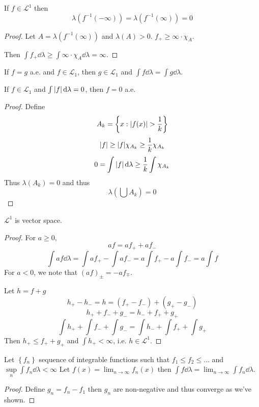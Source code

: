 \begin{prop}
	If $f\in \mathcal{L}^1$ then
	$$\lambda(f^{-1}(-\infty)) = \lambda(f^{-1}(\infty)) = 0$$
	\begin{proof}
		Let $A = \lambda(f^{-1}(\infty))$ and $\lambda(A) > 0$. 
		$f_+ \geq \infty \cdot \chi_A$.
		
		Then $\int f_+ \dd{\lambda} \geq \int \infty \cdot \chi_A \dd{\lambda} = \infty$.
	\end{proof}
\end{prop}


\begin{prop}
	If $f=g$ a.e. and $f\in \mathcal{L}_1$, then $g\in \mathcal{L}_1$ and $\int f\dd{\lambda}  =\int g\dd{\lambda}$.
\end{prop}


\begin{prop}
	If $f\in \mathcal{L}_1$ and $\int \abs{f} \dd{\lambda} = 0$, then $f=0$ a.e.
	\begin{proof}
		Define 
		$$A_k = \left\{ x: \abs{f(x) } > \frac{1}{k}  \right\}$$
		$$\abs{f} \geq \abs{f} \chi_{A_k} \geq \frac{1}{k} \chi_{A_k}$$
		$$0 =\int \abs{f} \dd{\lambda} \geq \frac{1}{k} \int \chi_{A_k} $$
		Thus $\lambda(A_k) = 0$ and thus
		$$\lambda(\bigcup A_k) = 0$$
	\end{proof}
\end{prop}

\begin{prop}
	$\mathcal{L}^1$ is vector space.
	\begin{proof}
		For $a\geq 0$,
		$$af = af_+ + af_-$$
		$$\int af \dd{\lambda} = \int af_+ - \int af_- = a\int f_+ - a\int f_- = a\int f$$
		For $a<0$, we note that $(af)_\pm = -af_\mp$.
		
		Let $h=f+g$
		$$h_+-h_- = h = (f_+-f_-) + (g_+ - g_-)$$
		$$h_+ + f_- + g_- = h_- + f_+ + g_+$$
		$$\int h_+ +\int f_- + \int g_-=  \int h_- + \int f_+ + \int g_+$$
		Then $h_+ \leq f_++ g_+$ and $\int h_+ < \infty$, i.e. $h\in \mathcal{L}^1$.
	\end{proof}
\end{prop}

\begin{theorem}
	Let $\left\{ f_n\right\}$ sequence of integrable functions such that $ f_1\leq f_2 \leq  \dots $ and $\sup\limits_n \int f_n \dd{\lambda} <\infty$
	Let $f(x) = \lim_{n\to\infty} f_n(x)$ then $\int f\dd{\lambda} = \lim_{n\to\infty} \int f_n \dd{\lambda}$.
	
	\begin{proof}
		Define $g_n = f_n-f_1$ then $g_n$ are non-negative and thus converge as we've shown.
	\end{proof}
	
\end{theorem}

